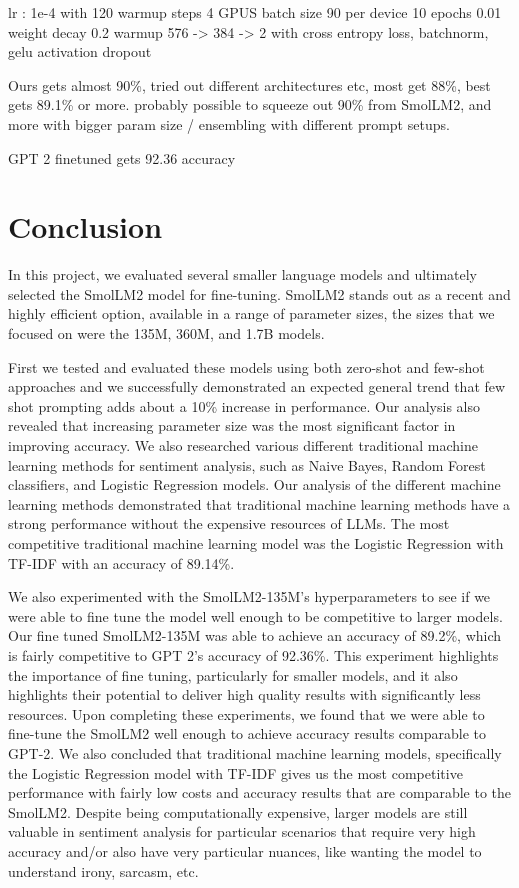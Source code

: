 \documentclass[10pt,twocolumn,letterpaper]{article}
\begin{document}
lr : 1e-4 with 120 warmup steps
4 GPUS batch size 90 per device
10 epochs
0.01 weight decay
0.2 warmup
576 -> 384 -> 2 with cross entropy loss, batchnorm, gelu activation
dropout

Ours gets almost 90\%, tried out different architectures etc, most get 88\%, best gets 89.1\% or more.
probably possible to squeeze out 90\% from SmolLM2, and more with bigger param size / ensembling with different prompt setups.

GPT 2 finetuned gets     92.36 accuracy

\section{Conclusion}
In this project, we evaluated several smaller language models and ultimately selected the SmolLM2 model for fine-tuning. SmolLM2 stands out as a recent and highly efficient option, available in a range of parameter sizes, the sizes that we focused on were the 135M, 360M, and 1.7B models. 

First we tested and evaluated these models using both zero-shot and few-shot approaches and we successfully demonstrated an expected general trend that few shot prompting adds about a 10\% increase in performance. Our analysis also revealed that increasing parameter size was the most significant factor in improving accuracy. 
We also researched various different traditional machine learning methods for sentiment analysis, such as Naive Bayes, Random Forest classifiers, and Logistic Regression models. Our analysis of the different machine learning methods demonstrated that traditional machine learning methods have a strong performance without the expensive resources of LLMs. The most competitive traditional machine learning model was the Logistic Regression with TF-IDF with an accuracy of 89.14\%.

We also experimented with the SmolLM2-135M’s hyperparameters to see if we were able to fine tune the model well enough to be competitive to larger models. Our fine tuned SmolLM2-135M was able to achieve an accuracy of 89.2\%, which is fairly competitive to GPT 2’s accuracy of 92.36\%. This experiment highlights the importance of fine tuning, particularly for smaller models, and it also highlights their potential to deliver high quality results with significantly less resources.
Upon completing these experiments,  we found that we were able to fine-tune the SmolLM2 well enough to achieve accuracy results comparable to GPT-2. We also concluded that traditional machine learning models, specifically the Logistic Regression model with TF-IDF gives us the most competitive performance with fairly low costs and accuracy results that are comparable to the SmolLM2. Despite being computationally expensive, larger models are still valuable in sentiment analysis for particular scenarios that require very high accuracy and/or also have very particular nuances, like wanting the model to understand irony, sarcasm, etc. 
\end{document}
